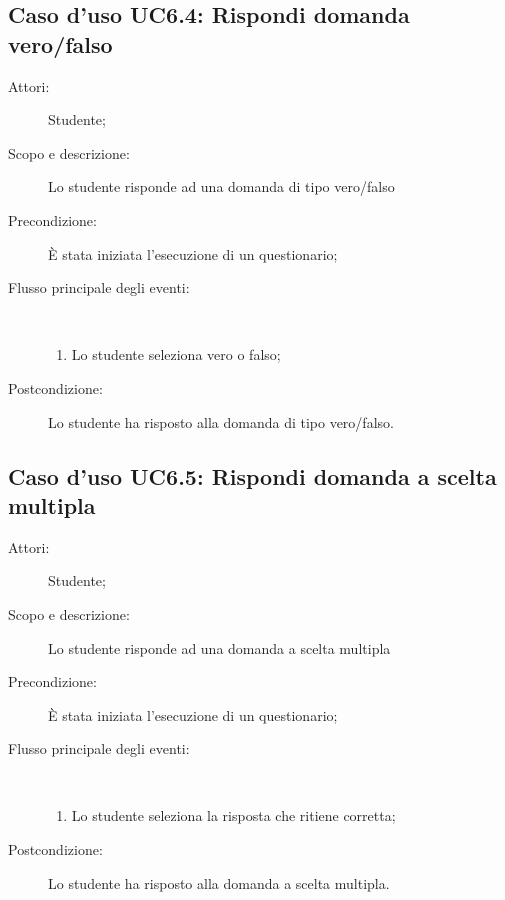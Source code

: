 \subsection{Caso d'uso UC6.4: Rispondi domanda vero/falso}\begin{description}
	\item[Attori:] Studente;
	\item[Scopo e descrizione:] Lo studente risponde ad una domanda di tipo vero/falso
	\item[Precondizione:] È stata iniziata l'esecuzione di un questionario;
	
	\item[Flusso principale degli eventi:] \ 
	\begin{enumerate}
		\item Lo studente seleziona vero o falso;
		
	\end{enumerate}
	\item[Postcondizione:] Lo studente ha risposto alla domanda di tipo vero/falso.
\end{description}
\hypertarget{UC6.5}{}
\subsection{Caso d'uso UC6.5: Rispondi domanda a scelta multipla}\begin{description}
	\item[Attori:] Studente;
	\item[Scopo e descrizione:] Lo studente risponde ad una domanda a scelta multipla
	\item[Precondizione:] È stata iniziata l'esecuzione di un questionario;
	
	\item[Flusso principale degli eventi:] \ 
	\begin{enumerate}
		\item Lo studente seleziona la risposta che ritiene corretta;
		
	\end{enumerate}
	\item[Postcondizione:] Lo studente ha risposto alla domanda a scelta multipla.
\end{description}
\hypertarget{UC6.6}{}
